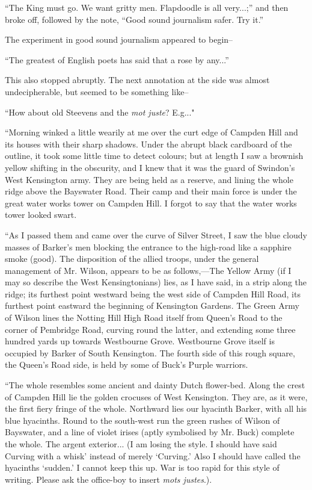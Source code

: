 \documentclass{book}
\begin{document}
“The King must go. We want gritty men. Flapdoodle is all very...;” and then broke off, followed by the note, “Good sound journalism safer. Try it.”

The experiment in good sound journalism appeared to begin–

“The greatest of English poets has said that a rose by any...”

This also stopped abruptly. The next annotation at the side was almost undecipherable, but seemed to be something like–

“How about old Steevens and the \emph{mot juste}? E.g..."

“Morning winked a little wearily at me over the curt edge of Campden Hill and its houses with their sharp shadows. Under the abrupt black cardboard of the outline, it took some little time to detect colours; but at length I saw a brownish yellow shifting in the obscurity, and I knew that it was the guard of Swindon’s West Kensington army. They are being held as a reserve, and lining the whole ridge above the Bayswater Road. Their camp and their main force is under the great water works tower on Campden Hill. I forgot to say that the water works tower looked swart.

“As I passed them and came over the curve of Silver Street, I saw the blue cloudy masses of Barker’s men blocking the entrance to the high-road like a sapphire smoke (good). The disposition of the allied troops, under the general management of Mr. Wilson, appears to be as follows,—The Yellow Army (if I may so describe the West Kensingtonians) lies, as I have said, in a strip along the ridge; its furthest point westward being the west side of Campden Hill Road, its furthest point eastward the beginning of Kensington Gardens. The Green Army of Wilson lines the Notting Hill High Road itself from Queen’s Road to the corner of Pembridge Road, curving round the latter, and extending some three hundred yards up towards Westbourne Grove. Westbourne Grove itself is occupied by Barker of South Kensington. The fourth side of this rough square, the Queen’s Road side, is held by some of Buck’s Purple warriors.

“The whole resembles some ancient and dainty Dutch flower-bed. Along the crest of Campden Hill lie the golden crocuses of West Kensington. They are, as it were, the first fiery fringe of the whole. Northward lies our hyacinth Barker, with all his blue hyacinths. Round to the south-west run the green rushes of Wilson of Bayswater, and a line of violet irises (aptly symbolised by Mr. Buck) complete the whole. The argent exterior... (I am losing the style. I should have said Curving with a whisk’ instead of merely ‘Curving.’ Also I should have called the hyacinths ‘sudden.’ I cannot keep this up. War is too rapid for this style of writing. Please ask the office-boy to insert \emph{mots justes}.).
\end{document}
